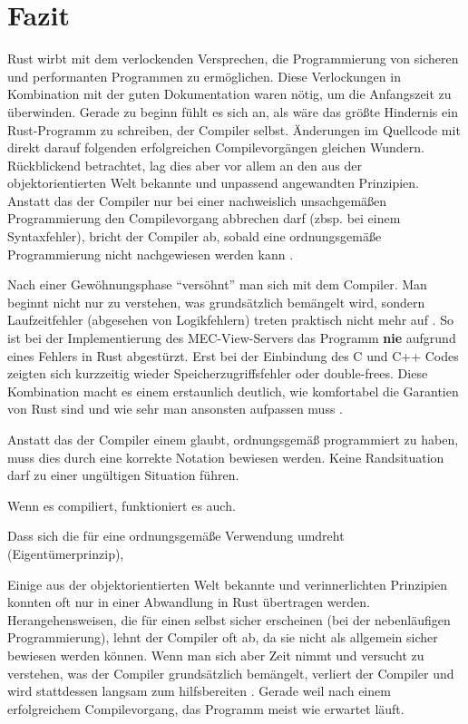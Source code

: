 \chapter{Fazit}

Rust wirbt mit dem verlockenden Versprechen, die Programmierung von sicheren und performanten Programmen zu ermöglichen.
Diese Verlockungen in Kombination mit der guten Dokumentation waren nötig, um die Anfangszeit zu überwinden.
Gerade zu beginn fühlt es sich an, als wäre das größte Hindernis ein Rust-Programm zu schreiben, der Compiler selbst.
Änderungen im Quellcode mit direkt darauf folgenden erfolgreichen Compilevorgängen gleichen Wundern.
Rückblickend betrachtet, lag dies aber vor allem an den aus der objektorientierten Welt bekannte und unpassend angewandten Prinzipien.
Anstatt das der Compiler nur bei einer nachweislich unsachgemäßen Programmierung den Compilevorgang abbrechen darf (zbsp. bei einem Syntaxfehler), bricht der Compiler ab, sobald eine ordnungsgemäße Programmierung nicht nachgewiesen werden kann .

Nach einer Gewöhnungsphase \enquote{versöhnt} man sich mit dem Compiler.
Man beginnt nicht nur zu verstehen, was grundsätzlich bemängelt wird, sondern Laufzeitfehler (abgesehen von Logikfehlern) treten praktisch nicht mehr auf .
So ist bei der Implementierung des MEC-View-Servers das Programm \textbf{nie} aufgrund eines Fehlers in Rust abgestürzt.
Erst bei der Einbindung des C und C++ Codes zeigten sich kurzzeitig wieder Speicherzugriffsfehler oder double-frees.
Diese Kombination macht es einem erstaunlich deutlich, wie komfortabel die Garantien von Rust sind und wie sehr man ansonsten aufpassen muss .

Anstatt das der Compiler einem glaubt, ordnungsgemäß programmiert zu haben, muss dies durch eine korrekte Notation bewiesen werden.
Keine Randsituation darf zu einer ungültigen Situation führen.

Wenn es compiliert, funktioniert es auch.

Dass sich die  für eine ordnungsgemäße Verwendung umdreht (Eigentümerprinzip), 

Einige aus der objektorientierten Welt bekannte und verinnerlichten Prinzipien konnten oft nur in einer Abwandlung in Rust übertragen werden.
Herangehensweisen, die für einen selbst sicher erscheinen (bei der nebenläufigen Programmierung), lehnt der Compiler oft ab, da sie nicht als allgemein sicher bewiesen werden können.
Wenn man sich aber Zeit nimmt und versucht zu verstehen, was der Compiler grundsätzlich bemängelt, verliert der Compiler  und wird stattdessen langsam zum hilfsbereiten .
Gerade weil nach einem erfolgreichem Compilevorgang, das Programm meist wie erwartet läuft.

